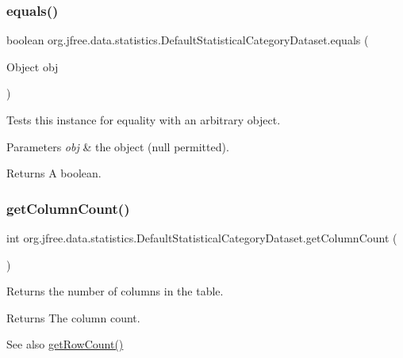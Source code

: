 \subsubsection{\texorpdfstring{equals()}{equals()}}
{\footnotesize\ttfamily boolean org.\+jfree.\+data.\+statistics.\+Default\+Statistical\+Category\+Dataset.\+equals (\begin{DoxyParamCaption}\item[{Object}]{obj }\end{DoxyParamCaption})}

Tests this instance for equality with an arbitrary object.


\begin{DoxyParams}{Parameters}
{\em obj} & the object ({\ttfamily null} permitted).\\
\hline
\end{DoxyParams}
\begin{DoxyReturn}{Returns}
A boolean. 
\end{DoxyReturn}
\mbox{\label{classorg_1_1jfree_1_1data_1_1statistics_1_1_default_statistical_category_dataset_a7902055e97297ac0e6a62506cbce677e}} 
\subsubsection{\texorpdfstring{get\+Column\+Count()}{getColumnCount()}}
{\footnotesize\ttfamily int org.\+jfree.\+data.\+statistics.\+Default\+Statistical\+Category\+Dataset.\+get\+Column\+Count (\begin{DoxyParamCaption}{ }\end{DoxyParamCaption})}

Returns the number of columns in the table.

\begin{DoxyReturn}{Returns}
The column count.
\end{DoxyReturn}
\begin{DoxySeeAlso}{See also}
\mbox{\hyperlink{classorg_1_1jfree_1_1data_1_1statistics_1_1_default_statistical_category_dataset_ae1ca17a2e7625045f1fd159054566ca8}{get\+Row\+Count()}} 
\end{DoxySeeAlso}



